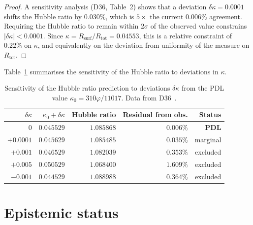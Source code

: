 \documentclass[11pt,a4paper]{article}
\theoremstyle{definition}
\newcommand{\Rtot}{R_{\mathrm{tot}}}
\newcommand{\Rsurf}{R_{\mathrm{surf}}}
\newcommand{\vp}{\varphi}
\newcommand{\kap}{\kappa}
\begin{document}
\begin{proof}
A sensitivity analysis (D36, Table~2) shows that a deviation
$\delta\kap = 0.0001$ shifts the Hubble ratio by $0.030\%$, which
is $5\times$ the current $0.006\%$ agreement. Requiring the Hubble
ratio to remain within $2\sigma$ of the observed value constrains
$|\delta\kap| < 0.0001$. Since $\kap = \Rsurf/\Rtot = 0.04553$,
this is a relative constraint of $0.22\%$ on $\kap$, and equivalently
on the deviation from uniformity of the measure on $\Rtot$.
\end{proof}

Table~\ref{tab:sensitivity} summarises the sensitivity of the Hubble
ratio to deviations in $\kap$.

\begin{table}[ht]
\centering
\caption{Sensitivity of the Hubble ratio prediction to deviations
$\delta\kap$ from the PDL value $\kap_0 = 310\vp/11017$.
Data from D36~\cite{PDL_D36_2026}.}
\label{tab:sensitivity}
\medskip
\begin{tabular}{rrrrr}
\toprule
$\delta\kap$ & $\kap_0 + \delta\kap$ & Hubble ratio &
Residual from obs. & Status \\
\midrule
$0$ & $0.045529$ & $1.085868$ & $0.006\%$ & \textbf{PDL} \\
$+0.0001$ & $0.045629$ & $1.085485$ & $0.035\%$ & marginal \\
$+0.001$ & $0.046529$ & $1.082039$ & $0.353\%$ & excluded \\
$+0.005$ & $0.050529$ & $1.068400$ & $1.609\%$ & excluded \\
$-0.001$ & $0.044529$ & $1.088988$ & $0.364\%$ & excluded \\
\bottomrule
\end{tabular}
\end{table}

\section{Epistemic status}
\label{sec:epistemic}
\end{document}
